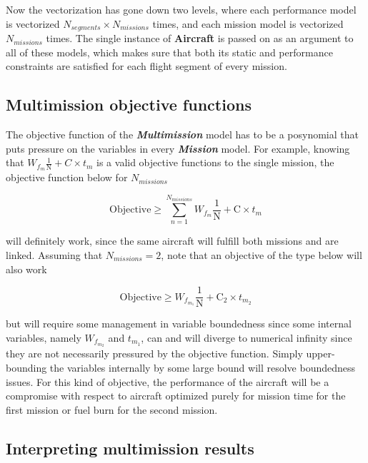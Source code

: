 Now the vectorization has gone down two levels, where each performance model is vectorized $N_{segments} \times N_{missions}$ times,
and each mission model is vectorized $N_{missions}$ times. The single instance of \textbf{Aircraft}
is passed on as an argument to all of these models, which makes sure that both its
static and performance constraints are satisfied for each flight segment
of every mission.

\subsection{Multimission objective functions}

The objective function of the \textbf{\textit{Multimission}} model has to be
a posynomial that puts pressure on the variables in every \textbf{\textit{Mission}} model. For example, knowing that
$W_{f_m} \frac{1}{\mathrm{N}} + C \times t_{m}$ is a valid objective functions to the single mission,
the objective function below for $N_{missions}$

\begin{equation}
    \mathrm{Objective} \geq \sum_{n=1}^{N_{missions}} W_{f_m} \frac{1}{\mathrm{N}} + \mathrm{C} \times t_{m}
    \label{e:compObj}
\end{equation}

will definitely work, since the same aircraft will fulfill both missions and are linked.
Assuming that $N_{missions} = 2$, note that an objective of the type below will also work

\begin{equation}
    \mathrm{Objective} \geq W_{f_{m_{1}}} \frac{1}{\mathrm{N}} + \mathrm{C}_{2} \times t_{m_{2}}
    \label{e:sepObj}
\end{equation}

but will require some management in variable boundedness since some internal variables,
namely  $W_{f_{m_{2}}}$ and $t_{m_{1}}$, can and will diverge to numerical infinity since they
are not necessarily pressured by the objective function.
Simply upper-bounding the variables
internally by some large bound will resolve boundedness issues. For this kind of objective, the
performance of the aircraft will be a compromise with respect to aircraft optimized purely
for mission time for the first mission or fuel burn for the second mission.

\subsection{Interpreting multimission results}

